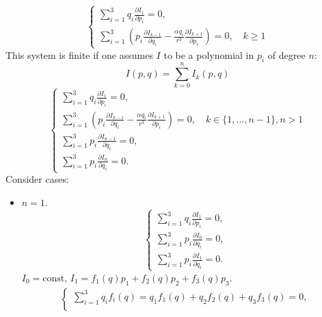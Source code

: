 \documentclass[12pt]{article}
\theoremstyle{definition}
\begin{document}
\begin{enumerate}
\begin{itemize}
        \begin{equation}
        \boxed{\begin{cases}
            \sum\limits_{i=1}^3q_i\frac{\partial I_1}{\partial p_i}=0,\\
            \sum\limits_{i=1}^3\left(p_i\frac{\partial I_{k-1}}{\partial q_i}-\frac{\alpha q_i}{r^3}\frac{\partial I_{k+1}}{\partial p_i}\right)=0,\quad k\geq1
        \end{cases}}
        \end{equation}
        This system is finite if one assumes $I$ to be a polynomial in $p_i$ of degree $n$:
        \begin{equation}
            I(p,q)=\sum\limits_{k=0}^nI_k(p,q)
        \end{equation}
         \begin{equation}
        \boxed{\begin{cases}
            \sum\limits_{i=1}^3q_i\frac{\partial I_1}{\partial p_i}=0,\\
            \sum\limits_{i=1}^3\left(p_i\frac{\partial I_{k-1}}{\partial q_i}-\frac{\alpha q_i}{r^3}\frac{\partial I_{k+1}}{\partial p_i}\right)=0,\quad k\in\{1,...,n-1\},n>1\\
            \sum\limits_{i=1}^3p_i\frac{\partial I_{n-1}}{\partial q_i}=0,\\
            \sum\limits_{i=1}^3p_i\frac{\partial I_n}{\partial q_i}=0.
        \end{cases}}
        \end{equation}
        Consider cases:
        \begin{itemize}
            \item $n=1$.
            \begin{equation}
                \begin{cases}
                    \sum\limits_{i=1}^3q_i\frac{\partial I_1}{\partial p_i}=0,\\
                    \sum\limits_{i=1}^3p_i\frac{\partial I_0}{\partial q_i}=0,\\
                    \sum\limits_{i=1}^3p_i\frac{\partial I_1}{\partial q_i}=0.
                \end{cases}
            \end{equation}
            $I_0=\text{const}$, $I_1=f_1(q)p_1+f_2(q)p_2+f_3(q)p_3$.
            \begin{multline}
                \begin{cases}
                    \sum\limits_{i=1}^3q_if_i(q)=q_1f_1(q)+q_2f_2(q)+q_3f_3(q)=0,\\

\end{cases}
\end{multline}
\end{itemize}
\end{itemize}
\end{enumerate}
\end{document}
